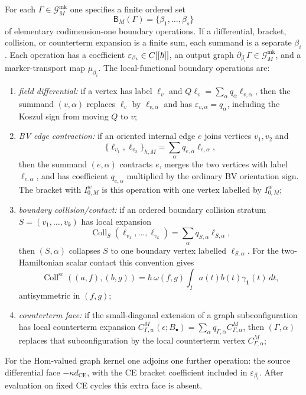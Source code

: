 \begin{defn}
  For each \(\Gamma\in\mathcal G^{\mathrm{mk}}_M\) one specifies a finite
  ordered set
  \[
    \mathsf B_M(\Gamma)=\{\beta_1,\ldots,\beta_s\}
  \]
  of elementary codimension-one boundary operations.  If a differential,
  bracket, collision, or counterterm expansion is a finite sum, each
  summand is a separate \(\beta_i\).  Each operation has a coefficient
  \(\varepsilon_{\beta_i}\in C[[\hbar]]\), an output graph
  \(\partial_{\beta_i}\Gamma\in\mathcal G^{\mathrm{mk}}_M\), and a
  marker-transport map \(\mu_{\beta_i}\).  The local-functional boundary
  operations are:
  \begin{enumerate}[label=(B\arabic*)]
    \item \emph{field differential:} if a vertex has label \(\ell_v\) and
    \(Q\ell_v=\sum_\alpha q_\alpha\ell_{v,\alpha}\), then the summand
    \((v,\alpha)\) replaces \(\ell_v\) by \(\ell_{v,\alpha}\) and has
    \(\varepsilon_{v,\alpha}=q_\alpha\), including the Koszul sign from
    moving \(Q\) to \(v\);
    \item \emph{BV edge contraction:} if an oriented internal edge \(e\)
    joins vertices \(v_1,v_2\) and
    \[
      \{\ell_{v_1},\ell_{v_2}\}_{\hbar,M}
        =
      \sum_\alpha q_{e,\alpha}\ell_{e,\alpha},
    \]
    then the summand \((e,\alpha)\) contracts \(e\), merges the two
    vertices with label \(\ell_{e,\alpha}\), and has coefficient
    \(q_{e,\alpha}\) multiplied by the ordinary BV orientation sign.  The
    bracket with \(I^w_{0,M}\) is this operation with one vertex labelled
    by \(I^w_{0,M}\);
    \item \emph{boundary collision/contact:} if an ordered boundary
    collision stratum \(S=(v_1,\ldots,v_k)\) has local expansion
    \[
      \operatorname{Coll}_{S}(\ell_{v_1},\ldots,\ell_{v_k})
        =
      \sum_\alpha q_{S,\alpha}\ell_{S,\alpha},
    \]
    then \((S,\alpha)\) collapses \(S\) to one boundary vertex labelled
    \(\ell_{S,\alpha}\).  For the two-Hamiltonian scalar contact this
    convention gives
    \[
      \operatorname{Coll}^{\mathrm{sc}}((a,f),(b,g))
        =
      \hbar\,\omega(f,g)\int_I a(t)b(t)\gamma_{\mathbf 1}(t)\,dt,
    \]
    antisymmetric in \((f,g)\);
    \item \emph{counterterm face:} if the small-diagonal extension of a
    graph subconfiguration has local counterterm expansion
    \(C^M_{\Gamma,w}(\epsilon;B_\bullet)=
    \sum_\alpha q_{\Gamma,\alpha}C^M_{\Gamma,\alpha}\), then
    \((\Gamma,\alpha)\) replaces that subconfiguration by the local
    counterterm vertex \(C^M_{\Gamma,\alpha}\);
  \end{enumerate}
  For the Hom-valued graph kernel one adjoins one further operation:
  the source differential face \(-\kappa d_{\mathrm{CE}}\), with the CE
  bracket coefficient included in \(\varepsilon_{\beta_i}\).  After
  evaluation on fixed CE cycles this extra face is absent.


\end{defn}
